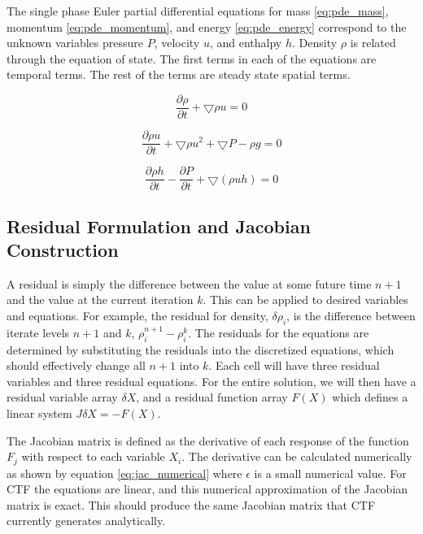 \documentclass{mc2015}
\begin{document}
The single phase Euler partial differential equations for mass
\eqref{eq:pde_mass}, momentum \eqref{eq:pde_momentum}, and energy
\eqref{eq:pde_energy} correspond to the unknown variables pressure $P$,
velocity $u$, and enthalpy $h$. Density $\rho$ is related through the equation
of state. The first terms in each of the equations are temporal terms. The rest
of the terms are steady state spatial terms. 
    
    \begin{equation}
    	\label{eq:pde_mass}
    	\frac{ \partial \rho}{\partial t} + \bigtriangledown \rho u = 0
    \end{equation}
    
    \begin{equation}
    	\label{eq:pde_momentum}
    	\frac{ \partial \rho u}{\partial t} + \bigtriangledown \rho u^{2} +
    	\bigtriangledown P - \rho g  = 0
    \end{equation}
    
    \begin{equation}
    	\label{eq:pde_energy}
    	\frac{ \partial \rho h}{\partial t} -
    	\frac{ \partial  P}{\partial t} + 
    	\bigtriangledown ( \rho  u h )
    	= 0
    \end{equation}

\subsection{Residual Formulation and Jacobian Construction}

	A residual is simply the difference between the value at some future time
    $n+1$ and the value at the current iteration $k$. This can be applied to
    desired variables and equations. For example, the residual for density,
    $\delta \rho_{i}$, is the difference between iterate levels
    $n+1$ and $k$, $\rho^{n+1}_{i} - \rho^{k}_{i}$. The residuals for the
    equations are determined by substituting the residuals into the discretized
    equations, which should effectively change all $n+1$ into $k$. Each cell
    will have three residual variables and three residual equations. For the
    entire solution, we will then have a residual variable array $\delta X$, and
    a residual function array $F(X)$ which defines a linear system $J \delta X =
    - F(X)$.
    
    The Jacobian matrix is defined as the derivative
    of each response of the function $F_{j}$ with respect to each variable $X_{i}$.
    The derivative can be calculated numerically as shown by equation
    \eqref{eq:jac_numerical} where $\epsilon$ is a small numerical value. For
    CTF the equations are linear, and this numerical approximation
    of the Jacobian matrix is exact. This should produce the same Jacobian
    matrix that CTF currently generates analytically. 
    
\end{document}
